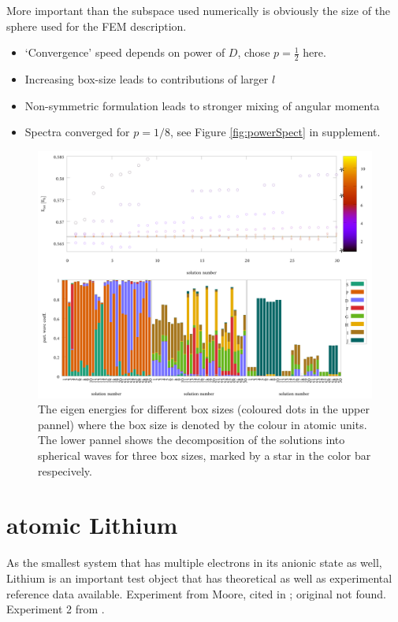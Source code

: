 More important than the subspace used numerically is obviously the size of the sphere used for the FEM description.
\begin{itemize}
   \item `Convergence' speed depends on power of $D$, chose $p=\frac 12$ here.
   \item Increasing box-size leads to contributions of larger $l$ 
   \item Non-symmetric formulation leads to stronger mixing of angular momenta
   \item Spectra converged for $p=1/8$, see Figure \ref{fig:powerSpect} in supplement.
\end{itemize}
\begin{figure}
\includegraphics[width=\textwidth]{Figures/RadWaves_p0_5.pdf}
\caption{The eigen energies for different box sizes (coloured dots in the upper pannel) where the box size is denoted by the colour in atomic units.
The lower pannel shows the decomposition of the solutions into spherical waves for three box sizes, marked by a star in the color bar respecively.}
\label{fig:RadWaves}
\end{figure}

\section{atomic Lithium}
As the smallest system that has multiple electrons in its anionic state as well, Lithium is an important
test object that has theoretical as well as experimental reference data available\cite{Li-R,Li-R1, LiNaRef1}.
Experiment from Moore, cited in \cite{LiNaRef1}; original not found.
Experiment 2 from \cite{LiSonntag}.

